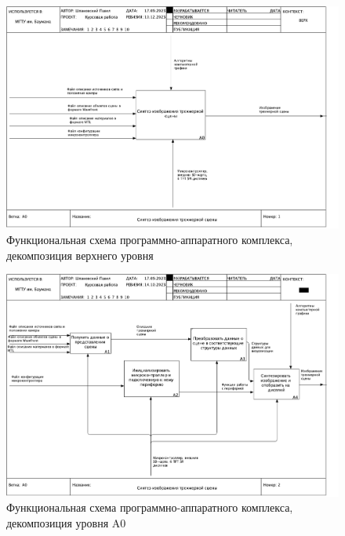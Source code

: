 \begin{figure}[H]
	\centering
	\includegraphics[height=0.45\textheight]{inc/img/01_A0.pdf}
	\caption{Функциональная схема программно-аппаратного комплекса, декомпозиция верхнего уровня}
	\label{fig:a01}
\end{figure}

\begin{figure}[H]
	\centering
	\includegraphics[height=0.45\textheight]{inc/img/02_A0.pdf}
	\caption{Функциональная схема программно-аппаратного комплекса, декомпозиция уровня A0}
	\label{fig:a02}
\end{figure}

